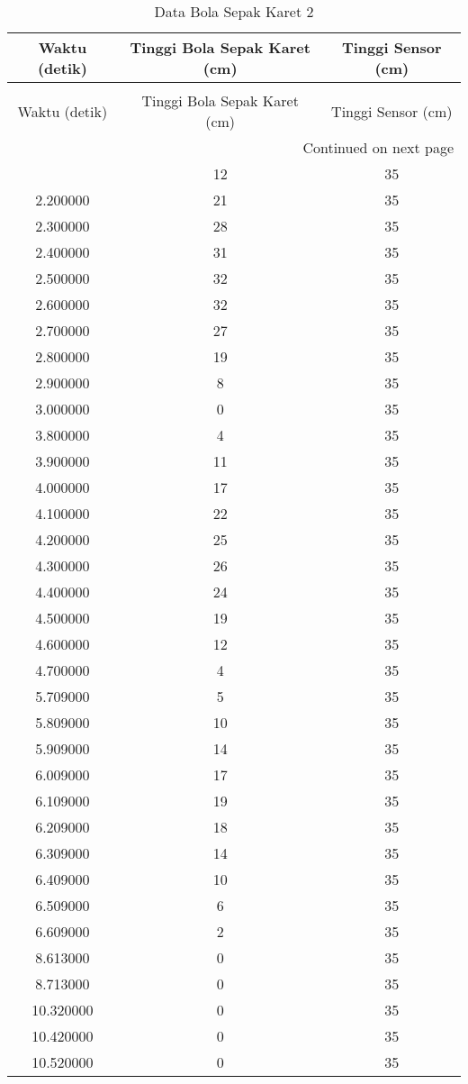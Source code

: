 \begin{longtable}[htbp]{|c|c|c|}
\caption{Data Bola Sepak Karet 2} \\
\hline
Waktu (detik) & Tinggi Bola Sepak Karet (cm) & Tinggi Sensor (cm) \\ \hline
\endfirsthead
\caption[]{Data Bola Sepak Karet 2} \\
\hline
Waktu (detik) & Tinggi Bola Sepak Karet (cm) & Tinggi Sensor (cm) \\ \hline
\endhead
\multicolumn{3}{r}{Continued on next page} \\
\endfoot
\endlastfoot
2.100000 & 12 & 35 \\ \hline
2.200000 & 21 & 35 \\ \hline
2.300000 & 28 & 35 \\ \hline
2.400000 & 31 & 35 \\ \hline
2.500000 & 32 & 35 \\ \hline
2.600000 & 32 & 35 \\ \hline
2.700000 & 27 & 35 \\ \hline
2.800000 & 19 & 35 \\ \hline
2.900000 & 8 & 35 \\ \hline
3.000000 & 0 & 35 \\ \hline
3.800000 & 4 & 35 \\ \hline
3.900000 & 11 & 35 \\ \hline
4.000000 & 17 & 35 \\ \hline
4.100000 & 22 & 35 \\ \hline
4.200000 & 25 & 35 \\ \hline
4.300000 & 26 & 35 \\ \hline
4.400000 & 24 & 35 \\ \hline
4.500000 & 19 & 35 \\ \hline
4.600000 & 12 & 35 \\ \hline
4.700000 & 4 & 35 \\ \hline
5.709000 & 5 & 35 \\ \hline
5.809000 & 10 & 35 \\ \hline
5.909000 & 14 & 35 \\ \hline
6.009000 & 17 & 35 \\ \hline
6.109000 & 19 & 35 \\ \hline
6.209000 & 18 & 35 \\ \hline
6.309000 & 14 & 35 \\ \hline
6.409000 & 10 & 35 \\ \hline
6.509000 & 6 & 35 \\ \hline
6.609000 & 2 & 35 \\ \hline
8.613000 & 0 & 35 \\ \hline
8.713000 & 0 & 35 \\ \hline
10.320000 & 0 & 35 \\ \hline
10.420000 & 0 & 35 \\ \hline
10.520000 & 0 & 35 \\ \hline
\end{longtable}
